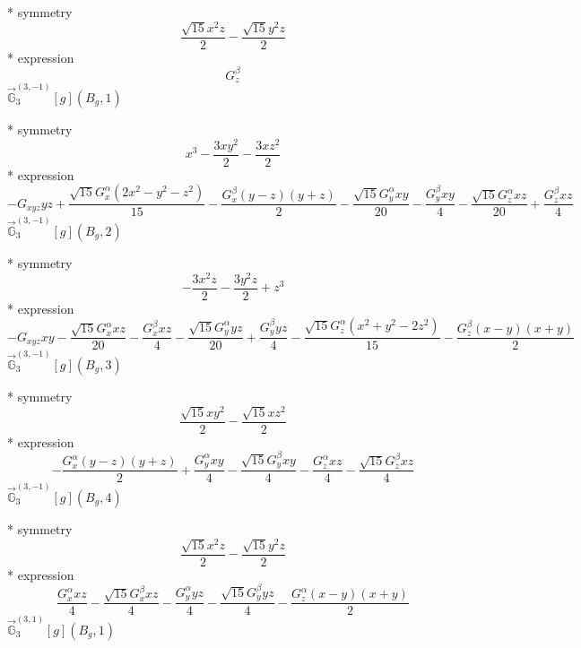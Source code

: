\documentclass[fleqn,8pt]{jsarticle}
\begin{document}
\noindent\quad ** symmetry
\begin{dmath*}
\frac{\sqrt{15} x^{2} z}{2} - \frac{\sqrt{15} y^{2} z}{2}
\end{dmath*}
\noindent\quad ** expression
\begin{dmath*}
G_{z}^{\beta}
\end{dmath*}
\noindent\quad $\vec{\mathbb{G}}_{3}^{(3,-1)}[g](B_{g},1)$

\noindent\quad ** symmetry
\begin{dmath*}
x^{3} - \frac{3 x y^{2}}{2} - \frac{3 x z^{2}}{2}
\end{dmath*}
\noindent\quad ** expression
\begin{dmath*}
- G_{xyz} y z + \frac{\sqrt{15} G_{x}^{\alpha} \left(2 x^{2} - y^{2} - z^{2}\right)}{15} - \frac{G_{x}^{\beta} \left(y - z\right) \left(y + z\right)}{2} - \frac{\sqrt{15} G_{y}^{\alpha} x y}{20} - \frac{G_{y}^{\beta} x y}{4} - \frac{\sqrt{15} G_{z}^{\alpha} x z}{20} + \frac{G_{z}^{\beta} x z}{4}
\end{dmath*}
\noindent\quad $\vec{\mathbb{G}}_{3}^{(3,-1)}[g](B_{g},2)$

\noindent\quad ** symmetry
\begin{dmath*}
- \frac{3 x^{2} z}{2} - \frac{3 y^{2} z}{2} + z^{3}
\end{dmath*}
\noindent\quad ** expression
\begin{dmath*}
- G_{xyz} x y - \frac{\sqrt{15} G_{x}^{\alpha} x z}{20} - \frac{G_{x}^{\beta} x z}{4} - \frac{\sqrt{15} G_{y}^{\alpha} y z}{20} + \frac{G_{y}^{\beta} y z}{4} - \frac{\sqrt{15} G_{z}^{\alpha} \left(x^{2} + y^{2} - 2 z^{2}\right)}{15} - \frac{G_{z}^{\beta} \left(x - y\right) \left(x + y\right)}{2}
\end{dmath*}
\noindent\quad $\vec{\mathbb{G}}_{3}^{(3,-1)}[g](B_{g},3)$

\noindent\quad ** symmetry
\begin{dmath*}
\frac{\sqrt{15} x y^{2}}{2} - \frac{\sqrt{15} x z^{2}}{2}
\end{dmath*}
\noindent\quad ** expression
\begin{dmath*}
- \frac{G_{x}^{\alpha} \left(y - z\right) \left(y + z\right)}{2} + \frac{G_{y}^{\alpha} x y}{4} - \frac{\sqrt{15} G_{y}^{\beta} x y}{4} - \frac{G_{z}^{\alpha} x z}{4} - \frac{\sqrt{15} G_{z}^{\beta} x z}{4}
\end{dmath*}
\noindent\quad $\vec{\mathbb{G}}_{3}^{(3,-1)}[g](B_{g},4)$

\noindent\quad ** symmetry
\begin{dmath*}
\frac{\sqrt{15} x^{2} z}{2} - \frac{\sqrt{15} y^{2} z}{2}
\end{dmath*}
\noindent\quad ** expression
\begin{dmath*}
\frac{G_{x}^{\alpha} x z}{4} - \frac{\sqrt{15} G_{x}^{\beta} x z}{4} - \frac{G_{y}^{\alpha} y z}{4} - \frac{\sqrt{15} G_{y}^{\beta} y z}{4} - \frac{G_{z}^{\alpha} \left(x - y\right) \left(x + y\right)}{2}
\end{dmath*}
\noindent\quad $\vec{\mathbb{G}}_{3}^{(3,1)}[g](B_{g},1)$
\end{document}
